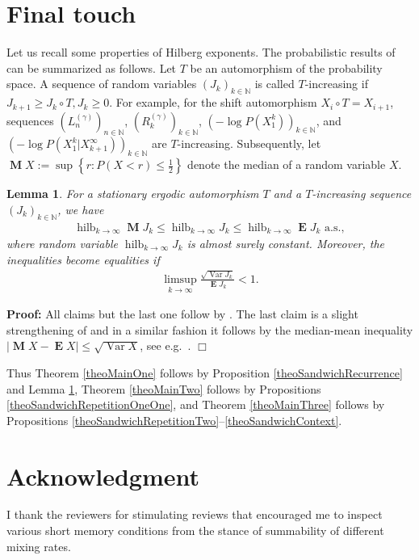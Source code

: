 \documentclass[a4paper,12pt]{article}
\newcommand{\abs}[1]{\left| #1 \right|}
\newcommand{\klam}[1]{\left\{ #1 \right\}}
\DeclareMathOperator*{\hilberg}{hilb}
\DeclareMathOperator{\var}{Var}
\DeclareMathOperator{\mean}{\mathbf{E}}
\DeclareMathOperator{\median}{\mathbf{M}}
\newtheorem{lemma}{Lemma}
\newenvironment*{proof}{\begin{trivlist}\item[]
\noindent\textbf{Proof:}}{$\Box$\par\end{trivlist}}
\begin{document}
\section{Final touch}
\label{secFinal}

Let us recall some properties of Hilberg exponents.  The probabilistic
results of \cite[Section 8.1]{Debowski21} can be summarized as
follows.  Let $T$ be an automorphism of the probability space.  A
sequence of random variables $(J_k)_{k\in\mathbb{N}}$ is called
$T$-increasing if
$J_{k+1}\ge J_k\circ T,J_k\ge 0$.
For example, for the shift automorphism $X_i\circ T=X_{i+1}$,
sequences $(L^{(\gamma)}_n)_{n\in\mathbb{N}}$,
$(R^{(\gamma)}_k)_{k\in\mathbb{N}}$,
$(-\log P(X_1^k))_{k\in\mathbb{N}}$, and
$(-\log P(X_1^k|X_{k+1}^\infty))_{k\in\mathbb{N}}$ are
$T$-increasing. Subsequently, let
$\median X:=\sup \klam{r: P(X<r)\le \frac{1}{2}}$ denote the median of
a random variable $X$.
\begin{lemma}
  \label{theoHilberg}
  For a stationary ergodic automorphism $T$ and a $T$-increasing
  sequence $(J_k)_{k\in\mathbb{N}}$, we have
  \begin{align}
    \hilberg_{k\rightarrow\infty} \median J_k
    \le \hilberg_{k\rightarrow\infty} J_k 
    \le \hilberg_{k\rightarrow\infty} \mean J_k
    \text{ a.s.}, 
  \end{align}
  where random variable $\hilberg_{k\rightarrow\infty} J_k$ is almost
  surely constant. Moreover, the inequalities become equalities if
  \begin{align}
    \limsup_{k\rightarrow\infty} \frac{\sqrt{\var J_k}}{\mean J_k}<1.
  \end{align}
\end{lemma}
\begin{proof}
  All claims but the last one follow by \cite[Theorems 8.3--8.5]{Debowski21}.
  The last claim is a slight strengthening of \cite[Theorem
  8.6]{Debowski21} and in a similar fashion it follows by the
  median-mean inequality $\abs{\median X-\mean X}\le \sqrt{\var X}$,
  see e.g.\ \cite[Theorem 3.17]{Debowski21}.
\end{proof}

Thus Theorem \ref{theoMainOne} follows by Proposition
\ref{theoSandwichRecurrence} and Lemma \ref{theoHilberg}, Theorem
\ref{theoMainTwo} follows by Propositions
\ref{theoSandwichRepetitionOneOne}, and Theorem \ref{theoMainThree}
follows by Propositions
\ref{theoSandwichRepetitionTwo}--\ref{theoSandwichContext}.





\section*{Acknowledgment}

I thank the reviewers for stimulating reviews that encouraged me to
inspect various short memory conditions from the stance of summability
of different mixing rates.
\end{document}

